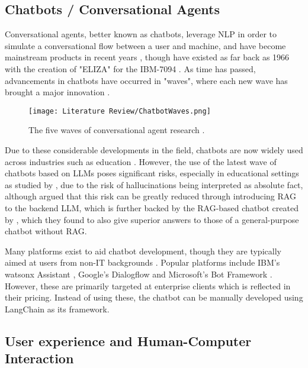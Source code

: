 \subsection{Chatbots / Conversational Agents}

Conversational agents, better known as chatbots, leverage NLP in order to simulate a conversational flow 
between a user and machine, and have become mainstream products in recent years \autocite{liao_all_2018},
though have existed as far back as 1966 with the creation of "ELIZA" for the IBM-7094 \autocite{weizenbaum_elizacomputer_1966}.
As time has passed, advancements in chatbots have occurred in "waves", where each new wave has brought a major innovation \autocite{schobel_charting_2024}.

\begin{figure}[H] 
    \centering
    \texttt{[image: Literature Review/ChatbotWaves.png]}
    \caption{The five waves of conversational agent research \autocite{schobel_charting_2024}.}
    \label{fig:ChatbotWaves}
\end{figure}

Due to these considerable developments in the field, chatbots are now widely used 
across industries such as education \autocite{kuhail_interacting_2023}. However, the use of the latest wave of chatbots based on LLMs
poses significant risks, especially in educational settings as studied by \textcite{neumann_llm-driven_2024},
due to the risk of hallucinations being interpreted as absolute fact, although \textcite{shuster_retrieval_2021} 
argued that this risk can be greatly reduced through introducing RAG to the backend LLM, which is further backed 
by the RAG-based chatbot created by \textcite{ge_development_2023}, which they found to also give superior answers
to those of a general-purpose chatbot without RAG.  


Many platforms exist to aid chatbot development, though they are typically aimed at users from non-IT backgrounds 
\autocite{srivastava_desirable_2020}. Popular platforms include IBM's watsonx Assistant \autocite{ibm_ibm_2024},
Google's Dialogflow \autocite{google_conversational_nodate} and Microsoft's Bot Framework \autocite{microsoft_microsoft_nodate}.
However, these are primarily targeted at enterprise clients which is reflected in their pricing. Instead of using these,
the chatbot can be manually developed using LangChain as its framework.



\subsection{User experience and Human-Computer Interaction}


